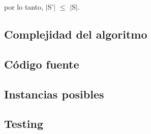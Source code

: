 por lo tanto, $|$S'$|$ $\leq$ $|$S$|$. 


\subsection{Complejidad del algoritmo}

\subsection{Código fuente}



\subsection{Instancias posibles}



\subsection{Testing}